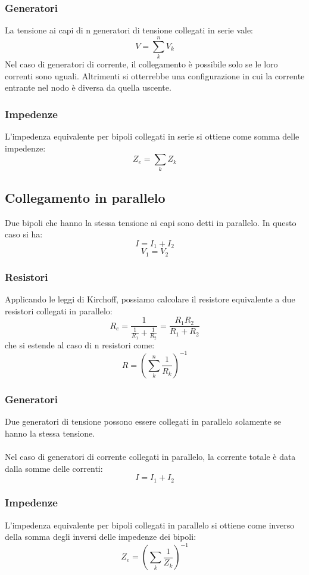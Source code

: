 \documentclass{article}
\begin{document}
\subsubsection{Generatori}
La tensione ai capi di n generatori di tensione collegati in serie vale:
$$ V=\sum_k^nV_k $$
Nel caso di generatori di corrente, il collegamento è possibile solo se le loro correnti sono uguali. Altrimenti si otterrebbe una configurazione in cui la corrente entrante nel nodo è diversa da quella uscente.

\subsubsection{Impedenze}
L'impedenza equivalente per bipoli collegati in serie si ottiene come somma delle impedenze:
$$ Z_e = \sum_k Z_k $$


\subsection{Collegamento in parallelo}
Due bipoli che hanno la stessa tensione ai capi sono detti in parallelo.
In questo caso si ha:
$$ I=I_1+I_2 $$
$$ V_1=V_2 $$

\subsubsection{Resistori}
Applicando le leggi di Kirchoff, possiamo calcolare il resistore equivalente a due resistori collegati in parallelo:
$$ R_e= \frac{1}{\frac{1}{R_1}+\frac{1}{R_2}}=\frac{R_1R_2}{R_1+R_2}$$
che si estende al caso di n resistori come:
$$ R=\left(\sum_k^n\frac{1}{R_k}\right)^{-1}$$

\subsubsection{Generatori}
Due generatori di tensione possono essere collegati in parallelo solamente se hanno la stessa tensione.\\\\
Nel caso di generatori di corrente collegati in parallelo, la corrente totale è data dalla somme delle correnti:
$$ I=I_1+I_2 $$

\subsubsection{Impedenze}
L'impedenza equivalente per bipoli collegati in parallelo si ottiene come inverso della somma degli inversi delle impedenze dei bipoli:
$$ Z_e = \left( \sum_k \frac{1}{Z_k} \right)^{-1} $$
\end{document}
